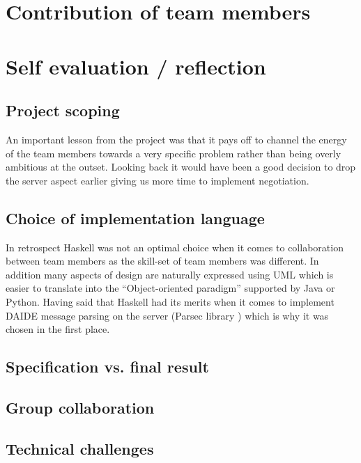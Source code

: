 \documentclass[pdftex,12pt,a4paper]{report}
\begin{document}

\section{Contribution of team members}


\section{Self evaluation / reflection}

\subsection{Project scoping}

An important lesson from the project was that it pays off to channel
the energy of the team members towards a very specific problem rather
than being overly ambitious at the outset. Looking back it would have
been a good decision to drop the server aspect earlier giving us more
time to implement negotiation.

\subsection{Choice of implementation language}

In retrospect Haskell was not an optimal choice when it comes to
collaboration between team members as the skill-set of team members
was different. In addition many aspects of design are naturally
expressed using UML which is easier to translate into the
``Object-oriented paradigm'' supported by Java or Python.  Having said
that Haskell had its merits when it comes to implement DAIDE message
parsing on the server (Parsec library \cite{ParsecLib}) which is why
it was chosen in the first place.


\subsection{Specification vs. final result}

\subsection{Group collaboration}

\subsection{Technical challenges}
\end{document}
